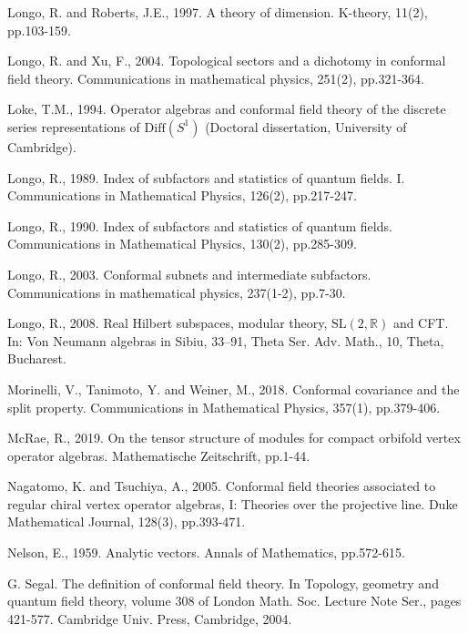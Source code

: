 \documentclass[12pt,a4paper]{article}
\theoremstyle{definition}
\theoremstyle{plain}
\newcommand{\mbb}{\mathbb}
\numberwithin{equation}{subsection}
\begin{document}
\begin{thebibliography}{999999}



Longo, R. and Roberts, J.E., 1997. A theory of dimension. K-theory, 11(2), pp.103-159.

Longo, R. and Xu, F., 2004. Topological sectors and a dichotomy in conformal field theory. Communications in mathematical physics, 251(2), pp.321-364.

Loke, T.M., 1994. Operator algebras and conformal field theory of the discrete series representations of $\mathrm{Diff}(S^1)$ (Doctoral dissertation, University of Cambridge).

Longo, R., 1989. Index of subfactors and statistics of quantum fields. I. Communications in Mathematical Physics, 126(2), pp.217-247.

Longo, R., 1990. Index of subfactors and statistics of quantum fields. Communications in Mathematical Physics, 130(2), pp.285-309.

Longo, R., 2003. Conformal subnets and intermediate subfactors. Communications in mathematical physics, 237(1-2), pp.7-30.

Longo, R., 2008. Real Hilbert subspaces, modular theory, $\mathrm{SL}(2,\mbb R)$ and CFT. In: Von Neumann algebras in Sibiu, 33–91, Theta Ser. Adv. Math., 10, Theta, Bucharest.

Morinelli, V., Tanimoto, Y. and Weiner, M., 2018. Conformal covariance and the split property. Communications in Mathematical Physics, 357(1), pp.379-406.

McRae, R., 2019. On the tensor structure of modules for compact orbifold vertex operator algebras. Mathematische Zeitschrift, pp.1-44.



Nagatomo, K. and Tsuchiya, A., 2005. Conformal field theories associated to regular chiral vertex operator algebras, I: Theories over the projective line. Duke Mathematical Journal, 128(3), pp.393-471.


Nelson, E., 1959. Analytic vectors. Annals of Mathematics, pp.572-615.

G. Segal. The definition of conformal field theory. In Topology, geometry and quantum field theory, volume 308 of London Math. Soc. Lecture Note Ser., pages 421-577. Cambridge Univ. Press, Cambridge, 2004.


\end{thebibliography}
\end{document}
